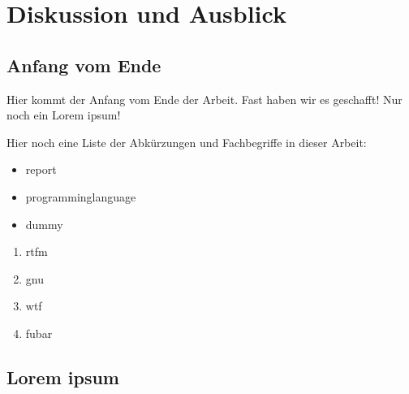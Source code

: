 \chapter{Diskussion und Ausblick}

\section{Anfang vom Ende}

Hier kommt der Anfang vom Ende der Arbeit.
Fast haben wir es geschafft! Nur noch ein Lorem ipsum!

Hier noch eine Liste der Abkürzungen und Fachbegriffe in dieser Arbeit:

\begin{itemize}
    \item \gls{report}
    \item \gls{programminglanguage}
    \item \gls{dummy}
\end{itemize}

\begin{enumerate}
    \item \acrshort{rtfm}
    \item \acrshort{gnu}
    \item \acrshort{wtf}
    \item \acrshort{fubar}
\end{enumerate}

\section{Lorem ipsum}

\lipsum